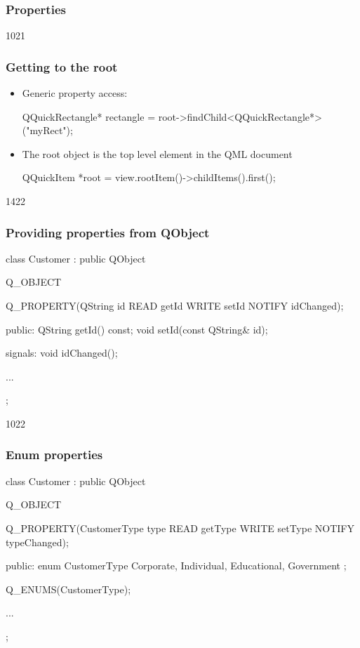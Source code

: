 \subsubsection{Properties}
\begin{slide}[fragile]{1021}
\frametitle{Getting to the root}
\begin{itemize}
\item Generic property access:\\
  \begin{cpp}
QQuickRectangle* rectangle
  = root->findChild<QQuickRectangle*>("myRect");
  \end{cpp}\medskip

\item The root object is the top level element in the QML document
  \begin{cpp}
QQuickItem *root = view.rootItem()->childItems().first();
  \end{cpp}
\end{itemize}
\end{slide}

\begin{slide}[fragile]{1422}
\frametitle{Providing properties from QObject}
\begin{cpp}
class Customer : public QObject
{
    Q_OBJECT

    Q_PROPERTY(QString id READ getId WRITE setId NOTIFY idChanged);

  public:
     QString getId() const;
     void setId(const QString& id);
  
  signals:
     void idChanged();

  ...
};
\end{cpp}
\end{slide}

\begin{slide}[fragile]{1022}
\frametitle{Enum properties}
\begin{cpp}
class Customer : public QObject
{
    Q_OBJECT

    Q_PROPERTY(CustomerType type READ getType WRITE setType 
               NOTIFY typeChanged);

  public:
    enum CustomerType {
      Corporate, Individual, Educational, Government
    };

    Q_ENUMS(CustomerType);
    
  ...
};
\end{cpp}
\end{slide}

